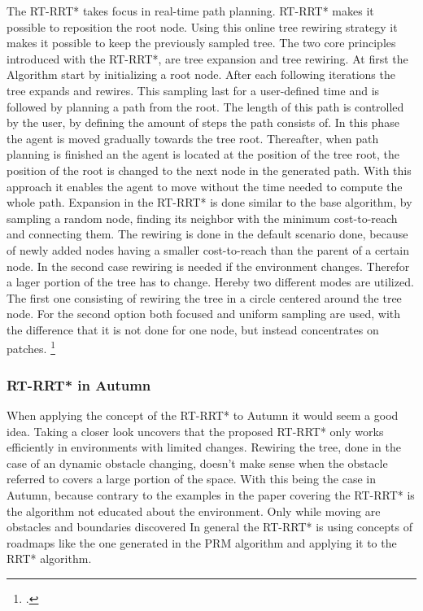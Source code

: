 The RT-RRT* takes focus in real-time path planning. RT-RRT* makes it possible to reposition the root node. Using this online tree rewiring strategy it makes it possible to keep the previously sampled tree.
The two core principles introduced with the RT-RRT*, are tree expansion and tree rewiring. 
At first the Algorithm start by initializing a root node. After each following iterations the tree expands and rewires. This sampling last for a user-defined time and is followed by planning a path from the root. The length of this path is controlled by the user, by defining the amount of steps the path consists of. In this phase the agent is moved gradually towards the tree root. Thereafter, when path planning is finished an the agent is located at the position of the tree root, the position of the root is changed to the next node in the generated path. With this approach it enables the agent to move without the time needed to compute the whole path.
Expansion in the RT-RRT* is done similar to the base algorithm, by sampling a random node, finding its neighbor with the minimum cost-to-reach and connecting them.
The rewiring is done in the default scenario done, because of newly added nodes having a smaller cost-to-reach than the parent of a certain node. In the second case rewiring is needed if the environment changes. Therefor a lager portion of the tree has to change. Hereby two different modes are utilized. The first one consisting of rewiring the tree in a circle centered around the tree node. For the second option both focused and uniform sampling are used, with the difference that it is not done for one node, but instead concentrates on patches.
\footcite{Naderi2015}

\subsubsection{RT-RRT* in Autumn}

When applying the concept of the RT-RRT* to Autumn it would seem a good idea. Taking a closer look uncovers that the proposed RT-RRT* only works efficiently in environments with limited changes. Rewiring the tree, done in the case of an dynamic obstacle changing, doesn't make sense when the obstacle referred to covers a large portion of the space. With this being the case in Autumn, because contrary to the examples in the paper covering the RT-RRT* is the algorithm not educated about the environment. Only while moving are obstacles and boundaries discovered In general the RT-RRT* is using concepts of roadmaps like the one generated in the PRM algorithm and applying it to the RRT* algorithm.  

